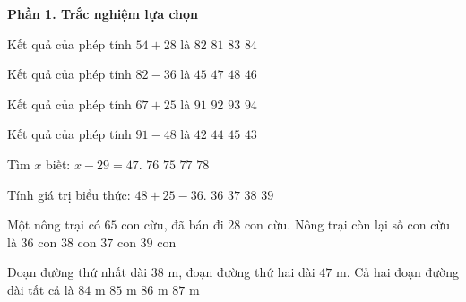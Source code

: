 \textbf{Phần 1. Trắc nghiệm lựa chọn}

\begin{ex} %
Kết quả của phép tính $54 + 28$ là
\choice
{\True $82$}
{$81$}
{$83$}
{$84$}
\end{ex}

\begin{ex} %
Kết quả của phép tính $82 - 36$ là
\choice
{$45$}
{$47$}
{$48$}
{\True $46$}
\end{ex}

\begin{ex} %
Kết quả của phép tính $67 + 25$ là
\choice
{$91$}
{\True $92$}
{$93$}
{$94$}
\end{ex}

\begin{ex} %
Kết quả của phép tính $91 - 48$ là
\choice
{$42$}
{$44$}
{$45$}
{\True $43$}
\end{ex}

\begin{ex} %
Tìm $x$ biết: $x - 29 = 47$.
\choice
{\True $76$}
{$75$}
{$77$}
{$78$}
\end{ex}

\begin{ex} %
Tính giá trị biểu thức: $48 + 25 - 36$.
\choice
{$36$}
{\True $37$}
{$38$}
{$39$}
\end{ex}

\begin{ex} %
Một nông trại có $65$ con cừu, đã bán đi $28$ con cừu. Nông trại còn lại số con cừu là
\choice
{$36$ con}
{$38$ con}
{\True $37$ con}
{$39$ con}
\end{ex}

\begin{ex} %
Đoạn đường thứ nhất dài $38\text{ m}$, đoạn đường thứ hai dài $47\text{ m}$. Cả hai đoạn đường dài tất cả là
\choice
{$84\text{ m}$}
{\True $85\text{ m}$}
{$86\text{ m}$}
{$87\text{ m}$}
\end{ex}

